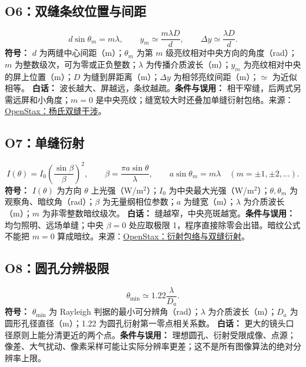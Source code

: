 \documentclass[UTF8,zihao=-4,openany,oneside,fontset=windows]{ctexbook}
\begin{document}
\subsection{O6：双缝条纹位置与间距}
\begin{equation}
d\sin\theta_m=m\lambda,\qquad y_m\simeq\frac{m\lambda D}{d},\qquad \Delta y\simeq\frac{\lambda D}{d}.
\end{equation}
\textbf{符号：} $d$ 为两缝中心间距（m）；$\theta_m$ 为第 $m$ 级亮纹相对中央方向的角度（rad）；$m$ 为整数级次，可为零或正负整数；$\lambda$ 为传播介质波长（m）；$y_m$ 为亮纹相对中央的屏上位置（m）；$D$ 为缝到屏距离（m）；$\Delta y$ 为相邻亮纹间距（m）；$\simeq$ 为近似相等。
\textbf{白话：} 波长越大、屏越远，条纹越疏。\textbf{条件与误用：} 相干窄缝，后两式另需远屏和小角度；$m=0$ 是中央亮纹；缝宽较大时还叠加单缝衍射包络。来源：\href{https://openstax.org/books/university-physics-volume-3/pages/3-1-youngs-double-slit-interference}{OpenStax：杨氏双缝干涉}。

\subsection{O7：单缝衍射}
\begin{equation}
I(\theta)=I_0\left(\frac{\sin\beta}{\beta}\right)^2,\qquad \beta=\frac{\pi a\sin\theta}{\lambda},\qquad a\sin\theta_m=m\lambda\quad(m=\pm1,\pm2,\ldots).
\end{equation}
\textbf{符号：} $I(\theta)$ 为方向 $\theta$ 上光强（W/m$^2$）；$I_0$ 为中央最大光强（W/m$^2$）；$\theta,\theta_m$ 为观察角、暗纹角（rad）；$\beta$ 为无量纲相位参数；$a$ 为缝宽（m）；$\lambda$ 为介质波长（m）；$m$ 为非零整数暗纹级次。
\textbf{白话：} 缝越窄，中央亮斑越宽。\textbf{条件与误用：} 均匀照明、远场单缝；中央 $\beta=0$ 处应取极限 1，程序直接除零会出错。暗纹公式不能把 $m=0$ 算成暗纹。来源：\href{https://openstax.org/books/university-physics-volume-3/pages/4-3-double-slit-diffraction}{OpenStax：衍射包络与双缝衍射}。

\subsection{O8：圆孔分辨极限}
\begin{equation}
\theta_{\min}\simeq1.22\frac{\lambda}{D_a}.
\end{equation}
\textbf{符号：} $\theta_{\min}$ 为 Rayleigh 判据的最小可分辨角（rad）；$\lambda$ 为介质波长（m）；$D_a$ 为圆形孔径直径（m）；1.22 为圆孔衍射第一零点相关系数。
\textbf{白话：} 更大的镜头口径原则上能分清更近的两个点。\textbf{条件与误用：} 理想圆孔、衍射受限成像、点源；像差、大气扰动、像素采样可能让实际分辨率更差；这不是所有图像算法的绝对分辨率上限。
\end{document}
